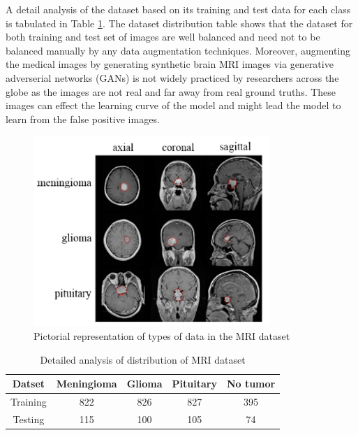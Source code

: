 \documentclass[12pt, a4paper,twoside]{report}
\theoremstyle{plain} %
\theoremstyle{definition} %
\theoremstyle{remark} %
\numberwithin{equation}{chapter}
\begin{document}
A detail analysis of the dataset based on its training and test data for each class is tabulated in Table \ref{tab:dataset_distribution}. The dataset distribution table shows that the dataset for both training and test set of images are well balanced and need not to be balanced manually by any data augmentation techniques. Moreover, augmenting the medical images by generating synthetic brain MRI images via generative adverserial networks (GANs) is not widely practiced by researchers across the globe as the images are not real and far away from real ground truths. These images can effect the learning curve of the model and might lead the model to learn from the false positive images. 

\begin{figure}[h]
    \centering
    \includegraphics[scale=1.7]{dataset_des.png}
    \caption{Pictorial representation of types of data in the MRI dataset}
    \label{fig:dataset_img}
\end{figure}

\begin{table}[ht]
    \centering
    \begin{tabular}{|c|c|c|c|c|}
        \hline
        Datset & Meningioma & Glioma & Pituitary & No tumor \\
        \hline
        Training & 822 & 826 & 827 & 395 \\
        Testing & 115 & 100 & 105 & 74 \\
        \hline
    \end{tabular}
    \caption{Detailed analysis of distribution of MRI dataset}
    \label{tab:dataset_distribution}
\end{table}
\end{document}
